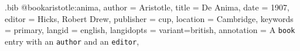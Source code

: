 

\begin{filecontents*}{\jobname.bib}
@book{aristotle:anima,
  author       = {Aristotle},
  title        = {De Anima},
  date         = 1907,
  editor       = {Hicks, Robert Drew},
  publisher    = cup,
  location     = {Cambridge},
  keywords     = {primary},
  langid       = {english},
  langidopts   = {variant=british},
  annotation   = {A \texttt{book} entry with an \texttt{author} and an
                  \texttt{editor}},
}
\end{filecontents*}

\documentclass{article}
\usepackage[style=numeric-comp]{biblatex}


\usepackage{ lipsum, xtemplate, tcolorbox }
{ listing options = { language = Tex, style = tcblatex } }

\usepackage{erw-biblatex}



\begin{listing-tex}
  \section{Fancy quotes}

  \noindent\lipsum[1][1]\\
  ---~

  \vspace{1em}

  \noindent\lipsum[1][2]\\
  ---~

  \section{References}
  \printbibliography[heading=none]

\end{listing-tex}


